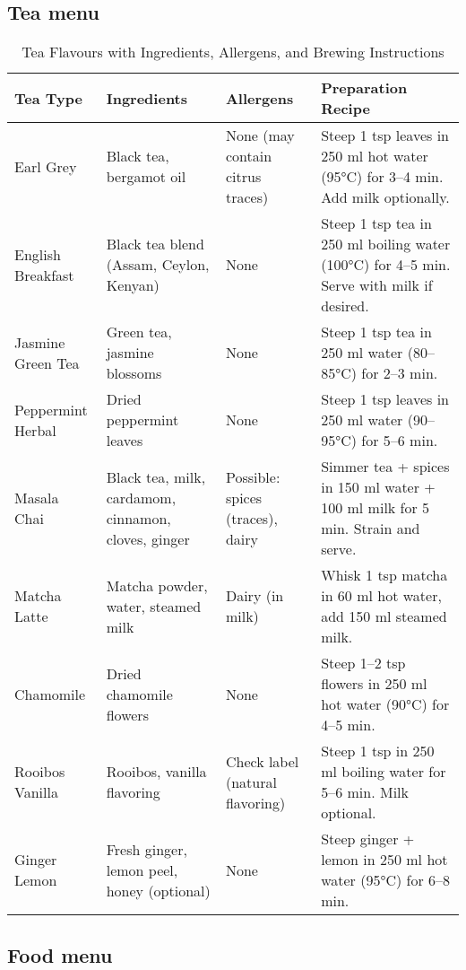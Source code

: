 \subsection*{Tea menu}
\begin{table}[h!]
\centering
\renewcommand{\arraystretch}{1.2}
\begin{tabular}{|p{3cm}|p{3.5cm}|p{3cm}|p{5cm}|}
\hline
\textbf{Tea Type} & \textbf{Ingredients} & \textbf{Allergens} & \textbf{Preparation Recipe} \\
\hline
Earl Grey & Black tea, bergamot oil & None (may contain citrus traces) & Steep 1 tsp leaves in 250 ml hot water (95°C) for 3–4 min. Add milk optionally. \\
\hline
English Breakfast & Black tea blend (Assam, Ceylon, Kenyan) & None & Steep 1 tsp tea in 250 ml boiling water (100°C) for 4–5 min. Serve with milk if desired. \\
\hline
Jasmine Green Tea & Green tea, jasmine blossoms & None & Steep 1 tsp tea in 250 ml water (80–85°C) for 2–3 min. \\
\hline
Peppermint Herbal & Dried peppermint leaves & None & Steep 1 tsp leaves in 250 ml water (90–95°C) for 5–6 min. \\
\hline
Masala Chai & Black tea, milk, cardamom, cinnamon, cloves, ginger & Possible: spices (traces), dairy & Simmer tea + spices in 150 ml water + 100 ml milk for 5 min. Strain and serve. \\
\hline
Matcha Latte & Matcha powder, water, steamed milk & Dairy (in milk) & Whisk 1 tsp matcha in 60 ml hot water, add 150 ml steamed milk. \\
\hline
Chamomile & Dried chamomile flowers & None & Steep 1–2 tsp flowers in 250 ml hot water (90°C) for 4–5 min. \\
\hline
Rooibos Vanilla & Rooibos, vanilla flavoring & Check label (natural flavoring) & Steep 1 tsp in 250 ml boiling water for 5–6 min. Milk optional. \\
\hline
Ginger Lemon & Fresh ginger, lemon peel, honey (optional) & None & Steep ginger + lemon in 250 ml hot water (95°C) for 6–8 min. \\
\hline
\end{tabular}
\caption{Tea Flavours with Ingredients, Allergens, and Brewing Instructions}
\end{table}

\newpage
\subsection*{Food menu}

